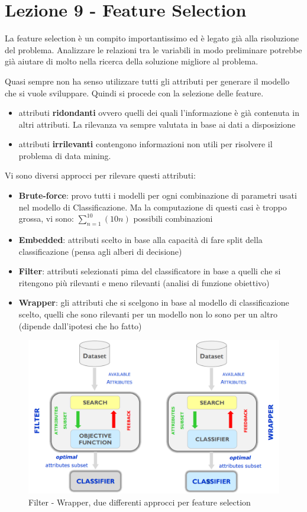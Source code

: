 \section{Lezione 9 - Feature Selection}
La feature selection \`e un compito importantissimo ed \`e legato gi\`a alla risoluzione del problema. Analizzare le relazioni tra le variabili in modo preliminare potrebbe gi\`a aiutare di molto nella ricerca della soluzione migliore al problema. 

Quasi sempre non ha senso utilizzare tutti gli attributi per generare il modello che si vuole sviluppare. Quindi si procede con la selezione delle feature.
\begin{itemize}
	\item attributi \textbf{ridondanti} ovvero quelli dei quali l'informazione \`e gi\`a contenuta in altri attributi. La rilevanza va sempre valutata in base ai dati a disposizione
	\item attributi \textbf{irrilevanti} contengono informazioni non utili per risolvere il problema di data mining.
\end{itemize}
Vi sono diversi approcci per rilevare questi attributi:
\begin{itemize}
	\item \textbf{Brute-force}: provo tutti i modelli per ogni combinazione di parametri usati nel modello di Classificazione. Ma la computazione di questi casi \`e troppo grossa, vi sono: $\sum_{n=1}^{10}\left(10 n\right)$ possibili combinazioni
	\item \textbf{Embedded}: attributi scelto in base alla capacit\`a di fare split della classificazione (pensa agli alberi di decisione)
	\item \textbf{Filter}: attributi selezionati pima del classificatore in base a quelli che si ritengono pi\`u rilevanti e meno rilevanti (analisi di funzione obiettivo)
	\item \textbf{Wrapper}: gli attributi che si scelgono in base al modello di classificazione scelto, quelli che sono rilevanti per un modello non lo sono per un altro (dipende dall'ipotesi che ho fatto)
\end{itemize}
\begin{figure}[h!]
	\centering
	\includegraphics[height=0.45 \linewidth]{pict/filter_wrapper.png}
	\caption{Filter - Wrapper, due differenti approcci per feature selection}
\end{figure}

